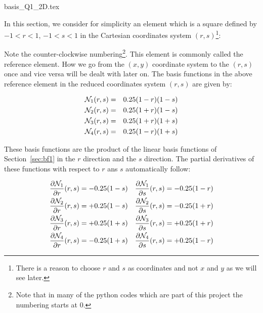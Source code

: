 \begin{flushright} {\tiny {\color{gray} basis\_Q1\_2D.tex}} \end{flushright}

In this section, we consider for simplicity an element which is a square defined 
by $-1<r<1$, $-1<s<1$ in the Cartesian coordinates system $(r,s)$\footnote{There is a 
reason to choose $r$ and $s$ as coordinates and not $x$ and $y$ as we will see later.}:



Note the counter-clockwise numbering\footnote{Note that in many of the python codes which 
are part of this project the numbering starts at 0.}.
This element is commonly called the reference element. How we go from the $(x,y)$ coordinate system 
to the $(r,s)$ once and vice versa will be dealt with later on.
The basis functions in the above reference element in the reduced 
coordinates system $(r,s)$ are given by:

\begin{mdframed}[backgroundcolor=blue!5]
\begin{eqnarray}
{\mathcal{N}}_1(r,s)&=&0.25(1-r)(1-s) \nonumber\\
{\mathcal{N}}_2(r,s)&=&0.25(1+r)(1-s) \nonumber\\
{\mathcal{N}}_3(r,s)&=&0.25(1+r)(1+s) \nonumber\\
{\mathcal{N}}_4(r,s)&=&0.25(1-r)(1+s) 
\end{eqnarray}
\end{mdframed}
These basis functions are the product of the linear basis functions of Section~\ref{sec:bf1}
in the $r$ direction and the $s$ direction.
The partial derivatives of these functions with respect to $r$ ans $s$ automatically follow:

\begin{mdframed}[backgroundcolor=blue!5]
\begin{align}
\frac{\partial {\mathcal{N}}_1}{\partial r}(r,s)&= - 0.25(1-s) &
\frac{\partial {\mathcal{N}}_1}{\partial s}(r,s)&= - 0.25(1-r) \nonumber\\
\frac{\partial {\mathcal{N}}_2}{\partial r}(r,s)&= + 0.25(1-s) &
\frac{\partial {\mathcal{N}}_2}{\partial s}(r,s)&= - 0.25(1+r) \nonumber\\
\frac{\partial {\mathcal{N}}_3}{\partial r}(r,s)&= + 0.25(1+s) &
\frac{\partial {\mathcal{N}}_3}{\partial s}(r,s)&= + 0.25(1+r) \nonumber\\
\frac{\partial {\mathcal{N}}_4}{\partial r}(r,s)&= - 0.25(1+s) &
\frac{\partial {\mathcal{N}}_4}{\partial s}(r,s)&= + 0.25(1-r) \nonumber
\end{align}
\end{mdframed}

